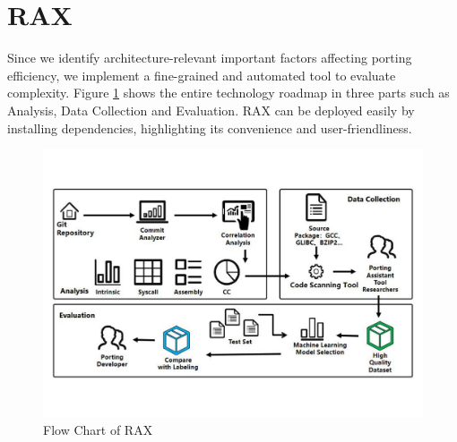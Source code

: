 \documentclass[sigconf,screen,review,anonymous]{acmart}
\begin{document}

\section{RAX}
Since we identify architecture-relevant important
factors affecting porting efficiency, we implement a fine-grained and automated tool to evaluate complexity. Figure \ref{fig:figure1} shows the entire technology roadmap in three parts such as Analysis, Data Collection and Evaluation. RAX can be deployed easily by installing dependencies, highlighting its convenience and user-friendliness.

\begin{figure}
  \centering
  \includegraphics[width=\linewidth]{figure1.pdf}
  \caption{Flow Chart of RAX}
  \label{fig:figure1}
\end{figure}
\end{document}

